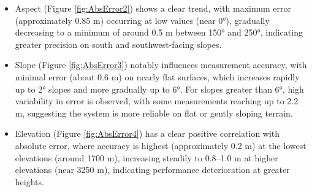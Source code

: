 \documentclass[preprint,12pt]{elsarticle}
\begin{document}
\begin{itemize}
    \item Aspect (Figure \ref{fig:AbsError2}) shows a clear trend, with maximum error (approximately 0.85 m) occurring at low values (near 0°), gradually decreasing to a minimum of around 0.5 m between 150° and 250°, indicating greater precision on south and southwest-facing slopes. %
    
    \item Slope (Figure \ref{fig:AbsError3}) notably influences measurement accuracy, with minimal error (about 0.6 m) on nearly flat surfaces, which increases rapidly up to 2° slopes and more gradually up to 6°. For slopes greater than 6°, high variability in error is observed, with some measurements reaching up to 2.2 m, suggesting the system is more reliable on flat or gently sloping terrain. %
     
     \item Elevation (Figure \ref{fig:AbsError4}) has a clear positive correlation with absolute error, where accuracy is highest (approximately 0.2 m) at the lowest elevations (around 1700 m), increasing steadily to 0.8--1.0 m at higher elevations (near 3250 m), indicating performance deterioration at greater heights. %
     

\end{itemize}
\end{document}
